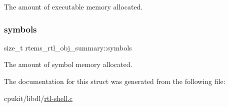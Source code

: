 The amount of executable memory allocated. \mbox{\label{structrtems__rtl__obj__summary_a763b0a7c9c53826d100a83db231aa665}} 
\subsubsection{\texorpdfstring{symbols}{symbols}}
{\footnotesize\ttfamily size\+\_\+t rtems\+\_\+rtl\+\_\+obj\+\_\+summary\+::symbols}

The amount of symbol memory allocated. 

The documentation for this struct was generated from the following file\+:\begin{DoxyCompactItemize}
\item 
cpukit/libdl/\mbox{\hyperlink{rtl-shell_8c}{rtl-\/shell.\+c}}\end{DoxyCompactItemize}
